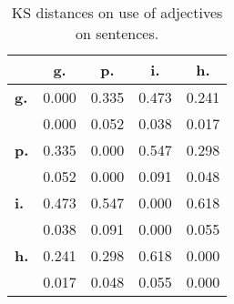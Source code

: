 \begin{table}[h!]
\begin{center}
\begin{tabular}{| l || c | c | c | c |}\hline
 & {\bf g.} & {\bf p.} & {\bf i.} & {\bf h.} \\\hline\hline
{\bf g.} & 0.000 & 0.335 & 0.473 & 0.241 \\
{\bf } & 0.000 & 0.052 & 0.038 & 0.017 \\\hline
{\bf p.} & 0.335 & 0.000 & 0.547 & 0.298 \\
{\bf } & 0.052 & 0.000 & 0.091 & 0.048 \\\hline
{\bf i.} & 0.473 & 0.547 & 0.000 & 0.618 \\
{\bf } & 0.038 & 0.091 & 0.000 & 0.055 \\\hline
{\bf h.} & 0.241 & 0.298 & 0.618 & 0.000 \\
{\bf } & 0.017 & 0.048 & 0.055 & 0.000 \\\hline
\end{tabular}
\caption{KS distances on use of adjectives on sentences.}
\end{center}
\end{table}